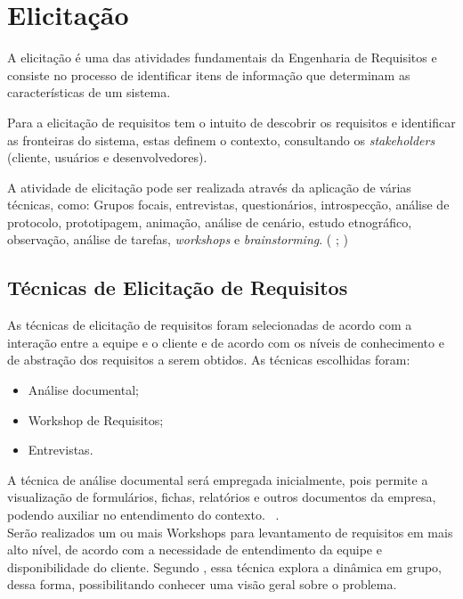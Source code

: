 \chapter[Elicitação]{Elicitação}
\label{tecnicas}
A elicitação é uma das atividades fundamentais da Engenharia de Requisitos e consiste no processo de identificar
itens de informação que determinam as características de um sistema. \cite{jitnah} 

Para  a elicitação de requisitos tem o intuito de descobrir
os requisitos e identificar as fronteiras do sistema, estas definem o contexto, consultando os \textit{stakeholders} (cliente, usuários e desenvolvedores).

A atividade de elicitação pode ser realizada através da aplicação de várias técnicas, como: Grupos focais, entrevistas, questionários,
introspecção, análise de protocolo, prototipagem, animação, análise de cenário, estudo etnográfico, observação, análise de tarefas,
\textit{workshops} e \textit{brainstorming}. (\cite{jitnah} ; \cite{coulin})

\section{Técnicas de Elicitação de Requisitos}

As técnicas de elicitação de requisitos foram selecionadas de acordo com a interação entre a equipe e o cliente e de acordo com os níveis de conhecimento e de abstração dos requisitos a serem obtidos.
As técnicas escolhidas foram:\\
\begin{itemize}
\item Análise documental;
\item Workshop de Requisitos;
\item Entrevistas.
\end{itemize}

A técnica de análise documental será empregada inicialmente, pois permite a visualização de formulários, fichas, relatórios e outros documentos da empresa, podendo auxiliar no entendimento do contexto. ~\cite{falbo}.\\

Serão realizados um ou mais Workshops para levantamento de requisitos em mais alto nível, de acordo com a necessidade de entendimento da equipe e disponibilidade do cliente.
Segundo , essa técnica explora a dinâmica em grupo, dessa forma, possibilitando conhecer uma visão geral sobre o problema.\\

